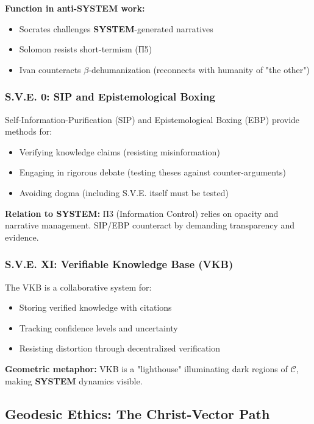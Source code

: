 \documentclass[11pt,a4paper]{article}
\newcommand{\SYSTEM}{\textbf{SYSTEM}}
\newcommand{\betaDehum}{$\beta$-dehumanization}
\newcommand{\CC}{$\mathcal{C}$}
\theoremstyle{definition}
\theoremstyle{remark}
\begin{document}
\textbf{Function in anti-\SYSTEM{} work:}
\begin{itemize}
\item Socrates challenges \SYSTEM{}-generated narratives
\item Solomon resists short-termism (П5)
\item Ivan counteracts \betaDehum{} (reconnects with humanity of "the other")
\end{itemize}

\subsubsection{S.V.E. 0: SIP and Epistemological Boxing}

\cite{sve0} Self-Information-Purification (SIP) and Epistemological Boxing (EBP) provide methods for:
\begin{itemize}
\item Verifying knowledge claims (resisting misinformation)
\item Engaging in rigorous debate (testing theses against counter-arguments)
\item Avoiding dogma (including S.V.E. itself must be tested)
\end{itemize}

\textbf{Relation to \SYSTEM{}:} П3 (Information Control) relies on opacity and narrative management. SIP/EBP counteract by demanding transparency and evidence.

\subsubsection{S.V.E. XI: Verifiable Knowledge Base (VKB)}

\cite{sve11} The VKB is a collaborative system for:
\begin{itemize}
\item Storing verified knowledge with citations
\item Tracking confidence levels and uncertainty
\item Resisting distortion through decentralized verification
\end{itemize}

\textbf{Geometric metaphor:} VKB is a "lighthouse" illuminating dark regions of \CC{}, making \SYSTEM{} dynamics visible.

\subsection{Geodesic Ethics: The Christ-Vector Path}
\end{document}
